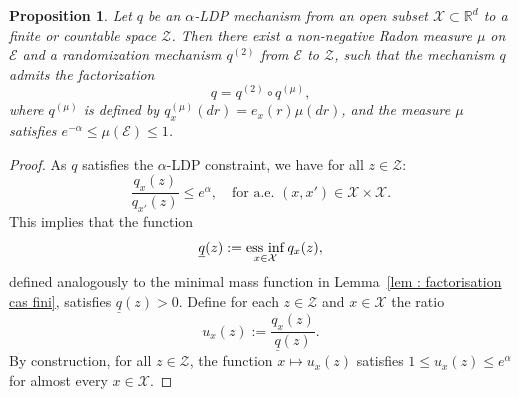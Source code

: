 \documentclass[a4paper, 11pt]{article}
\newtheorem{prop}{Proposition}
\theoremstyle{definition}
\newcommand{\essinf}{\mathop{\rm ess\ inf}}
\begin{document}
{\begin{prop} \label{prop : factor ctn}
Let $q$ be an $\alpha$-LDP mechanism from an open subset $\mathcal{X} \subset \mathbb{R}^d$ to a finite or countable space $\mathcal{Z}$. Then there exist a non-negative Radon measure $\mu$ on $\mathcal{E}$ and a randomization mechanism $q^{(2)}$ from $\mathcal{E}$ to $\mathcal{Z}$,
such that the mechanism $q$ admits the factorization
\[
	q = q^{(2)} \circ q^{(\mu)},
\]
where $q^{(\mu)}$ is defined by $q^{(\mu)}_x(dr) = e_x(r)\mu(dr)$, and the measure $\mu$ satisfies
$e^{-\alpha} \le \mu(\mathcal{E}) \le 1$.
\end{prop}




\begin{proof}
As $q$ satisfies the $\alpha$-LDP constraint, we have for all $z \in \mathcal{Z}$:
\[
\frac{q_x(z)}{q_{x'}(z)} \le e^\alpha, \quad \text{for a.e. } (x, x') \in \mathcal{X} \times \mathcal{X}.
\]
This implies that the function
\[
\underline{q}(z) := \essinf_{x \in \mathcal{X}} q_x(z),
\]
defined analogously to the minimal mass function in Lemma~\ref{lem : factorisation cas fini}, satisfies $\underline{q}(z) > 0$. Define for each $z \in \mathcal{Z}$ and $x \in \mathcal{X}$ the ratio
\[
u_x(z) := \frac{q_x(z)}{\underline{q}(z)}.
\]
By construction, for all $z \in \mathcal{Z}$, the function $x \mapsto u_x(z)$ satisfies $1 \le u_x(z) \le e^\alpha$ for almost every $x \in \mathcal{X}$. 


\end{proof}}
\end{document}
